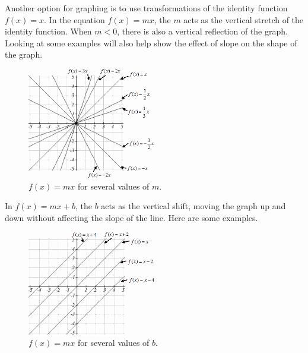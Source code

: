 Another option for graphing is to use transformations of the identity function $f(x)=x$. In the equation $f(x)=mx$, the $m$ acts as the vertical stretch of the identity function. When $m<0$, there is also a vertical reflection of the graph. Looking at some examples will also help show the effect of slope on the shape of the graph.

\begin{figure}[!ht]
\centering
\includegraphics[width=0.5\textwidth]{img/chap1/sec1-4/image050.png}
\caption{$f(x)=mx$ for several values of $m$.}
\end{figure}

In $f(x)=mx+b$, the $b$ acts as the vertical shift, moving the graph up and down without affecting the slope of the line. Here are some examples.

\begin{figure}[!ht]
  \centering
  \includegraphics[width=0.5\textwidth]{img/chap1/sec1-4/image051.png}
  \caption{$f(x)=mx$ for several values of $b$.}
\end{figure}

